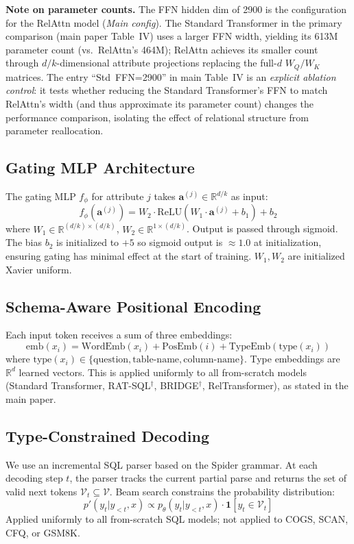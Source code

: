 \documentclass[conference]{IEEEtran}
\newcommand{\R}{\mathbb{R}}
\begin{document}
\noindent\textbf{Note on parameter counts.}
The FFN hidden dim of 2900 is the configuration for the RelAttn model (\emph{Main config}). The Standard Transformer in the primary comparison (main paper Table~IV) uses a larger FFN width, yielding its 613M parameter count (vs.\ RelAttn's 464M); RelAttn achieves its smaller count through $d/k$-dimensional attribute projections replacing the full-$d$ $W_Q/W_K$ matrices. The entry ``Std~FFN=2900'' in main Table~IV is an \emph{explicit ablation control}: it tests whether reducing the Standard Transformer's FFN to match RelAttn's width (and thus approximate its parameter count) changes the performance comparison, isolating the effect of relational structure from parameter reallocation.

\subsection{Gating MLP Architecture}

The gating MLP $f_\phi$ for attribute $j$ takes $\mathbf{a}^{(j)} \in \R^{d/k}$ as input:
\[
f_\phi(\mathbf{a}^{(j)}) = W_2 \cdot \text{ReLU}(W_1 \cdot \mathbf{a}^{(j)} + b_1) + b_2
\]
where $W_1 \in \R^{(d/k) \times (d/k)}$, $W_2 \in \R^{1 \times (d/k)}$. Output is passed through sigmoid. The bias $b_2$ is initialized to $+5$ so sigmoid output is $\approx 1.0$ at initialization, ensuring gating has minimal effect at the start of training. $W_1, W_2$ are initialized Xavier uniform.

\subsection{Schema-Aware Positional Encoding}

Each input token receives a sum of three embeddings:
\[
\text{emb}(x_i) = \text{WordEmb}(x_i) + \text{PosEmb}(i) + \text{TypeEmb}(\text{type}(x_i))
\]
where $\text{type}(x_i) \in \{\text{question}, \text{table-name}, \text{column-name}\}$. Type embeddings are $\R^d$ learned vectors. This is applied uniformly to all from-scratch models (Standard Transformer, RAT-SQL$^\dagger$, BRIDGE$^\dagger$, RelTransformer), as stated in the main paper.

\subsection{Type-Constrained Decoding}

We use an incremental SQL parser based on the Spider grammar. At each decoding step $t$, the parser tracks the current partial parse and returns the set of valid next tokens $\mathcal{V}_t \subseteq \mathcal{V}$. Beam search constrains the probability distribution:
\[
p'(y_t | y_{<t}, x) \propto p_\theta(y_t | y_{<t}, x) \cdot \mathbf{1}[y_t \in \mathcal{V}_t]
\]
Applied uniformly to all from-scratch SQL models; not applied to COGS, SCAN, CFQ, or GSM8K.
\end{document}
